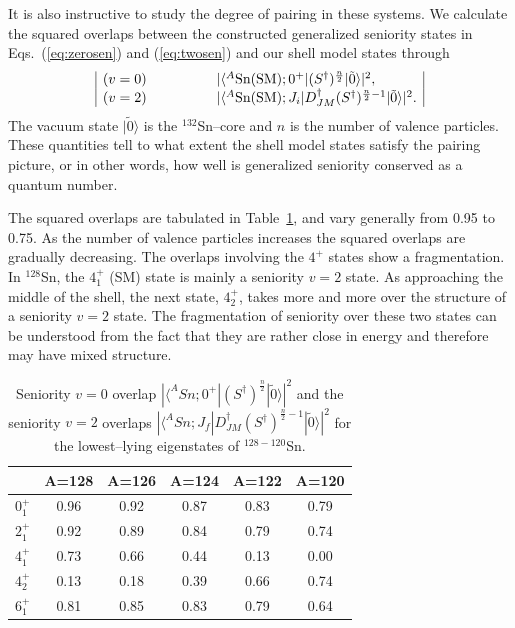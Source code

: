 \documentclass{article}
\begin{document}
It is also instructive to study the degree of pairing in these systems.
We calculate the squared overlaps between the constructed generalized seniority
states in Eqs.~(\ref{eq:zerosen}) and (\ref{eq:twosen}) and our shell model states
through
\begin{equation}
\begin{array}{|lccccl|}
(v=0) & & & & &
|\langle ^{A}{\rm Sn(SM)} ;
0^{+}|(S^{\dagger})^{\frac{n}{2}}| \tilde{0} \rangle |^{2}, \\
(v=2) & & & & &
|\langle ^{A}{\rm Sn(SM)} ;
J_{i}|D^{\dagger}_{JM}(S^{\dagger})^{\frac{n}{2}-1}| \tilde{0} \rangle |^{2}. 
\end{array}
\end{equation}
The vacuum state $|\tilde{0} \rangle $ is the $^{132}$Sn--core and $n$ is
the number of valence particles. These quantities tell to what extent the 
shell model states satisfy the pairing picture, or in other words, how well 
is generalized seniority conserved as a quantum number.

The squared overlaps are tabulated in Table~\ref{tab:seniority}, and vary
generally from 0.95 to 0.75. As the number of valence particles increases the 
squared overlaps are gradually decreasing. The overlaps involving the $4^{+}$
states show a fragmentation. In $^{128}$Sn, the $4^{+}_{1}$ (SM)
state is mainly a seniority $v=2$ state. As approaching the middle of the 
shell, the next state, $4^{+}_{2}$, takes more and more over the 
structure of a seniority $v=2$ state. The fragmentation of seniority over these
two states can be understood from the fact that they are rather close in 
energy and therefore may have mixed structure.

\begin{table}[htbp]
\caption{ Seniority $v=0$ overlap 
         $|\langle ^{A}Sn;0^{+}|(S^{\dagger})^{\frac{n}{2}}| 
         \tilde{0} \rangle |^{2}$ and the seniority $v=2$ 
         overlaps $|\langle ^{A}Sn ;J_{f}|
         D^{\dagger}_{JM}(S^{\dagger})^{\frac{n}{2} - 1}| 
         \tilde{0} \rangle |^{2}$ for the lowest--lying eigenstates 
         of $^{128-120}$Sn.}
\label{tab:seniority}
\begin{center}
\begin{tabular}{|cccccc|}
\hline
 & A=128 & A=126 & A=124 & A=122 & A=120 \\ 
\hline
$0^{+}_{1}$ & 0.96 & 0.92 & 0.87 & 0.83 & 0.79 \\ 
$2^{+}_{1}$ & 0.92 & 0.89 & 0.84 & 0.79 & 0.74 \\ 
$4^{+}_{1}$ & 0.73 & 0.66 & 0.44 & 0.13 & 0.00 \\ 
$4^{+}_{2}$ & 0.13 & 0.18 & 0.39 & 0.66 & 0.74 \\
$6^{+}_{1}$ & 0.81 & 0.85 & 0.83 & 0.79 & 0.64 \\
\hline
\end{tabular}
\end{center}
\end{table}
\end{document}

